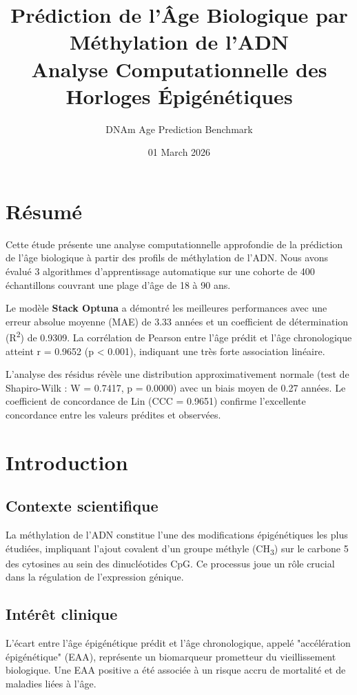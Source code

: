 \documentclass[11pt,a4paper]{article}
\title{
    \textbf{\color{primary}Prédiction de l'Âge Biologique par Méthylation de l'ADN} \\
    \large Analyse Computationnelle des Horloges Épigénétiques
}
\author{DNAm Age Prediction Benchmark}
\date{01 March 2026}
\begin{document}
\maketitle

\section*{Résumé}
Cette étude présente une analyse computationnelle approfondie de la prédiction de l'âge biologique à partir des profils de méthylation de l'ADN. Nous avons évalué 3 algorithmes d'apprentissage automatique sur une cohorte de 400 échantillons couvrant une plage d'âge de 18 à 90 ans.

Le modèle \textbf{Stack Optuna} a démontré les meilleures performances avec une erreur absolue moyenne (MAE) de 3.33 années et un coefficient de détermination (R\textsuperscript{2}) de 0.9309. La corrélation de Pearson entre l'âge prédit et l'âge chronologique atteint r = 0.9652 (p < 0.001), indiquant une très forte association linéaire.

L'analyse des résidus révèle une distribution approximativement normale (test de Shapiro-Wilk : W = 0.7417, p = 0.0000) avec un biais moyen de 0.27 années. Le coefficient de concordance de Lin (CCC = 0.9651) confirme l'excellente concordance entre les valeurs prédites et observées.

\tableofcontents
\newpage

\section{Introduction}
\subsection{Contexte scientifique}
La méthylation de l'ADN constitue l'une des modifications épigénétiques les plus étudiées, impliquant l'ajout covalent d'un groupe méthyle (CH\textsubscript{3}) sur le carbone 5 des cytosines au sein des dinucléotides CpG. Ce processus joue un rôle crucial dans la régulation de l'expression génique.

\subsection{Intérêt clinique}
L'écart entre l'âge épigénétique prédit et l'âge chronologique, appelé "accélération épigénétique" (EAA), représente un biomarqueur prometteur du vieillissement biologique. Une EAA positive a été associée à un risque accru de mortalité et de maladies liées à l'âge.
\end{document}
